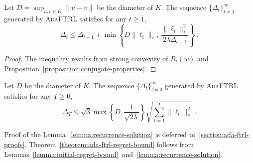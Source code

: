 \begin{lemma}[Recurrence]
\label{lemma:gap-recurrence}
Let $D = \sup_{u, v \in K} \|u -v\|$ be the diameter of $K$.
The sequence $\{\Delta_t\}_{t=1}^\infty$ generated by \textsc{AdaFTRL} satisfies for any $t \ge 1$,
$$
\Delta_t \le \Delta_{t-1} + \min \left\{ D\|\ell_t\|_*, \ \frac{\|\ell_t\|_*^2}{2\lambda \Delta_{t-1}} \right\} \; .
$$
\end{lemma}

\begin{proof}
The inequality results from strong convexity of $R_t(w)$ and
Proposition~\ref{proposition:conjugate-properties}.
\end{proof}

\begin{lemma}
\label{lemma:recurrence-solution}
Let $D$ be the diameter of $K$. The sequence $\{\Delta_t\}_{t=0}^\infty$
generated by \textsc{AdaFTRL} satisfies for any $T \ge 0$,
$$
\Delta_T \le \sqrt{3} \max\left\{D, \frac{1}{\sqrt{2\lambda}} \right\} \sqrt{\sum_{t=1}^T \|\ell_t\|_*^2} \; .
$$
\end{lemma}
%
Proof of the Lemma~\ref{lemma:recurrence-solution} is deferred to~\ref{section:ada-ftrl-proofs}.
Theorem~\ref{theorem:ada-ftrl-regret-bound} follows from
Lemmas~\ref{lemma:initial-regret-bound}~and~\ref{lemma:recurrence-solution}.
